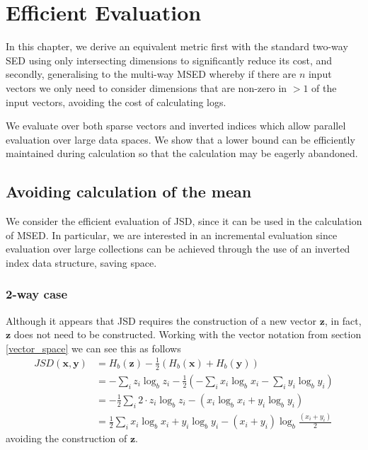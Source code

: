 \chapter{Efficient Evaluation}\label{ch:efficient_eval}

In this chapter, we derive an equivalent metric first with the standard two-way SED using only intersecting 
dimensions to significantly reduce its cost, and secondly, generalising to the multi-way MSED whereby if there are $n$ input vectors we only need to consider dimensions that are non-zero in $> 1$ of the input vectors, avoiding the cost of calculating logs.  

We evaluate over both sparse vectors and inverted indices which allow parallel evaluation over large data spaces.  We show that a lower bound can be efficiently maintained during calculation so that the calculation may be eagerly abandoned.
\section{Avoiding calculation of the mean}
We consider the efficient evaluation of JSD, since it can be used in the calculation of MSED.  In particular, we are interested in an incremental evaluation since evaluation over large collections can be achieved through the use of an inverted index data structure, saving space.
\subsection{2-way case}
Although it appears that JSD requires the construction of a new vector $\mathbf{z}$, in fact, $\mathbf{z}$ does not need to be constructed.  Working with the vector notation from section \ref{vector_space} we can see this as follows
\begin{align}
    JSD(\mathbf{x}, \mathbf{y}) &= H_b(\mathbf{z}) - \frac{1}{2}(H_b(\mathbf{x}) + H_b(\mathbf{y}))\\
    &= -\sum_i z_i \log_b z_i - \frac{1}{2}(-\sum_i  x_i \log_b x_i - \sum_i  y_i \log_b y_i)\\
    &= -\frac{1}{2}\sum_i 2 \cdot z_i \log_b z_i - (x_i \log_b x_i + y_i \log_b y_i)\\
    &= \frac{1}{2}\sum_i  x_i \log_b x_i + y_i \log_b y_i  - (x_i+y_i) \log_b \frac{(x_i+y_i)}{2}
\end{align}  
%
avoiding the construction of $\mathbf{z}$.

